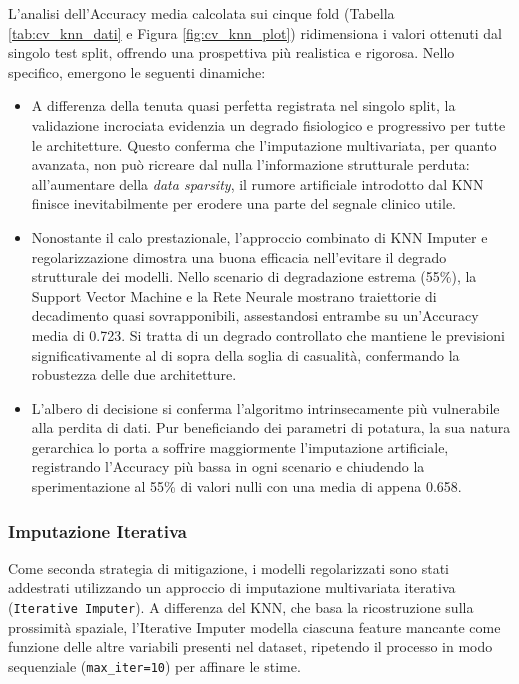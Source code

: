 \documentclass[12pt]{article}
\begin{document}
L'analisi dell'Accuracy media calcolata sui cinque fold (Tabella \ref{tab:cv_knn_dati} e Figura \ref{fig:cv_knn_plot}) ridimensiona i valori ottenuti dal singolo test split, offrendo una prospettiva più realistica e rigorosa. Nello specifico, emergono le seguenti dinamiche:

\begin{itemize}
    \item A differenza della tenuta quasi perfetta registrata nel singolo split, la validazione incrociata evidenzia un degrado fisiologico e progressivo per tutte le architetture. Questo conferma che l'imputazione multivariata, per quanto avanzata, non può ricreare dal nulla l'informazione strutturale perduta: all'aumentare della \textit{data sparsity}, il rumore artificiale introdotto dal KNN finisce inevitabilmente per erodere una parte del segnale clinico utile.
    
    \item Nonostante il calo prestazionale, l'approccio combinato di KNN Imputer e regolarizzazione dimostra una buona efficacia nell'evitare il degrado strutturale dei modelli. Nello scenario di degradazione estrema (55\%), la Support Vector Machine e la Rete Neurale mostrano traiettorie di decadimento quasi sovrapponibili, assestandosi entrambe su un'Accuracy media di 0.723. Si tratta di un degrado controllato che mantiene le previsioni significativamente al di sopra della soglia di casualità, confermando la robustezza delle due architetture.
    
    \item L'albero di decisione si conferma l'algoritmo intrinsecamente più vulnerabile alla perdita di dati. Pur beneficiando dei parametri di potatura, la sua natura gerarchica lo porta a soffrire maggiormente l'imputazione artificiale, registrando l'Accuracy più bassa in ogni scenario e chiudendo la sperimentazione al 55\% di valori nulli con una media di appena 0.658.
\end{itemize}

\subsubsection{Imputazione Iterativa}

Come seconda strategia di mitigazione, i modelli regolarizzati sono stati addestrati utilizzando un approccio di imputazione multivariata iterativa (\texttt{Iterative Imputer}). A differenza del KNN, che basa la ricostruzione sulla prossimità spaziale, l'Iterative Imputer modella ciascuna feature mancante come funzione delle altre variabili presenti nel dataset, ripetendo il processo in modo sequenziale (\texttt{max\_iter=10}) per affinare le stime.
\end{document}
